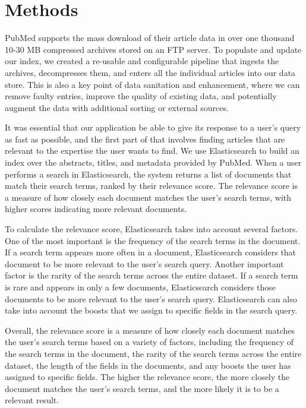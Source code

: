 \section{Methods}

PubMed supports the mass download of their article data in over one thousand 10-30 MB compressed archives stored on an FTP server. To populate and update our index, we created a re-usable and configurable pipeline that ingests the archives, decompresses them, and enters all the individual articles into our data store. This is also a key point of data sanitation and enhancement, where we can remove faulty entries, improve the quality of existing data, and potentially augment the data with additional sorting or external sources.

It was essential that our application be able to give its response to a user's query as fast as possible, and the first part of that involves finding articles that are relevant to the expertise the user wants to find. We use Elasticsearch to build an index over the abstracts, titles, and metadata provided by PubMed. When a user performs a search in Elasticsearch, the system returns a list of documents that match their search terms, ranked by their relevance score. The relevance score is a measure of how closely each document matches the user's search terms, with higher scores indicating more relevant documents.

To calculate the relevance score, Elasticsearch takes into account several factors. One of the most important is the frequency of the search terms in the document. If a search term appears more often in a document, Elasticsearch considers that document to be more relevant to the user's search query. Another important factor is the rarity of the search terms across the entire dataset. If a search term is rare and appears in only a few documents, Elasticsearch considers those documents to be more relevant to the user's search query. Elasticsearch can also take into account the boosts that we assign to specific fields in the search query.

Overall, the relevance score is a measure of how closely each document matches the user's search terms based on a variety of factors, including the frequency of the search terms in the document, the rarity of the search terms across the entire dataset, the length of the fields in the documents, and any boosts the user has assigned to specific fields. The higher the relevance score, the more closely the document matches the user's search terms, and the more likely it is to be a relevant result.

